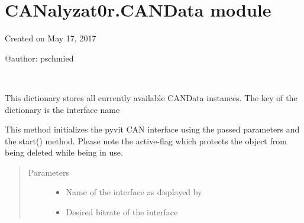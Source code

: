 \documentclass[letterpaper,10pt,english]{sphinxmanual}
\begin{document}
\section{CANalyzat0r.CANData module}
\label{\detokenize{src:module-src.CANData}}\label{\detokenize{src:canalyzat0r-candata-module}}
Created on May 17, 2017

@author: pschmied

\begin{fulllineitems}
\label{\detokenize{src:src.CANData.CANData}}~

\begin{fulllineitems}
\label{\detokenize{src:src.CANData.CANData.CANDataInstances}}
This dictionary stores all currently available CANData instances. The key
of the dictionary is the interface name

\end{fulllineitems}


\begin{fulllineitems}
\label{\detokenize{src:src.CANData.CANData.__init__}}
This method initializes the pyvit CAN interface using the passed parameters and the start() method.
Please note the active-flag which protects the object from being deleted while being in use.
\begin{quote}\begin{description}
\item[{Parameters}] \leavevmode\begin{itemize}
\item {} 
 \textendash{} Name of the interface as displayed by 

\item {} 
 \textendash{} Desired bitrate of the interface

\end{itemize}

\end{description}\end{quote}


\end{fulllineitems}
\end{fulllineitems}
\end{document}
